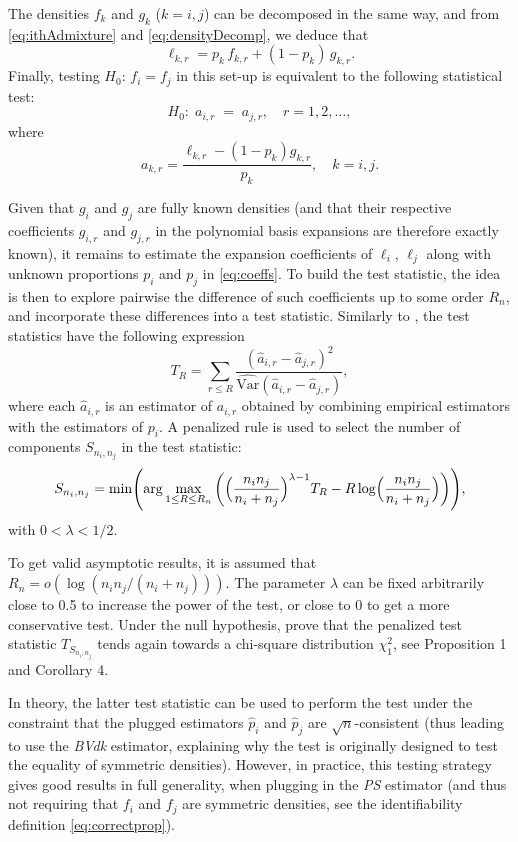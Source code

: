 The densities \(f_k\) and \(g_k\) (\(k=i,j\)) can be decomposed in the same way, and from \eqref{eq:ithAdmixture} and \eqref{eq:densityDecomp}, we deduce that
\[\ell_{k,r} = p_k \, f_{k,r} + (1-p_k) \, g_{k,r}.\]
Finally, testing \(H_0: \, f_i = f_j\) in this set-up is equivalent to the following statistical test:
\begin{equation}
  H_0: \; a_{i,r} \; = \;  a_{j,r}, \quad r=1,2, \dots,
\label{eq:newTestOrtho}
\end{equation}
where
\begin{equation}
  a_{k,r} = \frac{\ell_{k,r} - (1-p_k) g_{k,r}}{p_k}, \quad k=i,j.
\label{eq:coeffs}
\end{equation}

Given that \(g_i\) and \(g_j\) are fully known densities (and that their respective coefficients \(g_{i,r}\) and \(g_{j,r}\) in the polynomial basis expansions are therefore exactly known), it remains to estimate the expansion coefficients of \(\ell_i\), \(\ell_j\) along with unknown proportions \(p_i\) and \(p_j\) in \eqref{eq:coeffs}. To build the test statistic, the idea is then to explore pairwise the difference of such coefficients up to some order \(R_n\), and incorporate these differences into a test statistic. Similarly to \citet{Pommeret+Vandekerkhove:2019}, the test statistics have the following expression
\[
T_{R} = \sum_{r \leq R} \frac{(\widehat a_{i,r} - \widehat a_{j,r})^2}{\widehat{\mathrm{Var}}(\widehat a_{i,r} - \widehat a_{j,r})},
\]
where each \(\widehat a_{i,r}\) is an estimator of \(a_{i,r}\) obtained by combining empirical estimators with the estimators of \(p_i\).
A penalized rule is used to select the number of components \(S_{n_i,n_j}\) in the test statistic:
\[
S_{n_i,n_j} = \min \Biggl( \arg\max_{1 \leq R \leq R_n} \left( \Bigl(\frac{n_i n_j}{n_i+n_j}\Bigr)^{\lambda - 1} T_R - R \log\Bigl(\frac{n_i n_j}{n_i+n_j}\Bigr) \right) \Biggr),
\]
with \(0 < \lambda < 1/2\).

To get valid asymptotic results, it is assumed that \(R_n=o(\log(n_i n_j/(n_i+n_j)))\). The parameter \(\lambda\) can be fixed arbitrarily close to 0.5 to increase the power of the test, or close to 0 to get a more conservative test. Under the null hypothesis, \citet{Milhaud+Pommeret+Salhi+Vandekerkhove:2022} prove that the penalized test statistic \(T_{S_{n_i,n_j}}\) tends again towards a chi-square distribution \(\chi^2_1\), see Proposition 1 and Corollary 4.

In theory, the latter test statistic can be used to perform the test under the constraint that the plugged estimators \(\hat{p}_i\) and \(\hat{p}_j\) are \(\sqrt{n}\)-consistent (thus leading to use the \emph{BVdk} estimator, explaining why the test is originally designed to test the equality of symmetric densities). However, in practice, this testing strategy gives good results in full generality, when plugging in the \emph{PS} estimator (and thus not requiring that \(f_i\) and \(f_j\) are symmetric densities, see the identifiability definition \eqref{eq:correctprop}).

